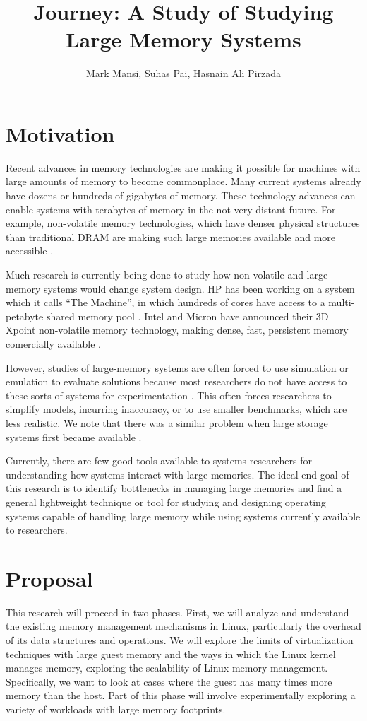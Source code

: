 \documentclass[twocolumn,11pt]{article}
\title{Journey: A Study of Studying Large Memory Systems}
\author{Mark Mansi, Suhas Pai, Hasnain Ali Pirzada}
\date{}
\begin{document}
\maketitle

\section{Motivation}

Recent advances in memory technologies are making it possible for machines with
large amounts of memory to become commonplace. Many current systems already
have dozens or hundreds of gigabytes of memory. These technology advances can
enable systems with terabytes of memory in the not very distant future. For
example, non-volatile memory technologies, which have denser physical
structures than traditional DRAM are making such large memories available and
more accessible \cite{xpoint}.

Much research is currently being done to study how non-volatile and large
memory systems would change system design. HP has been working on a system
which it calls ``The Machine'', in which hundreds of cores have access to a
multi-petabyte shared memory pool \cite{hp_machine}. Intel and
Micron have announced their 3D Xpoint non-volatile memory technology, making
dense, fast, persistent memory comercially available \cite{xpoint}.

However, studies of large-memory systems are often forced to use simulation or
emulation to evaluate solutions because most researchers do not have access to
these sorts of systems for experimentation \cite{quartz}. This often
forces researchers to simplify models, incurring inaccuracy, or to use smaller
benchmarks, which are less realistic. We note that there was a similar problem
when large storage systems first became available \cite{david, exalt}.

Currently, there are few good tools available to systems researchers for
understanding how systems interact with large memories. The ideal end-goal of
this research is to identify bottlenecks in managing large memories and find a
general lightweight technique or tool for studying and designing operating
systems capable of handling large memory while using systems currently
available to researchers.

\section{Proposal}

This research will proceed in two phases. First, we will analyze and understand
the existing memory management mechanisms in Linux, particularly the overhead
of its data structures and operations. We will explore the limits of
virtualization techniques with large guest memory and the ways in which the
Linux kernel manages memory, exploring the scalability of Linux memory
management. Specifically, we want to look at cases where the guest has many
times more memory than the host. Part of this phase will involve experimentally
exploring a variety of workloads with large memory footprints.
\end{document}
